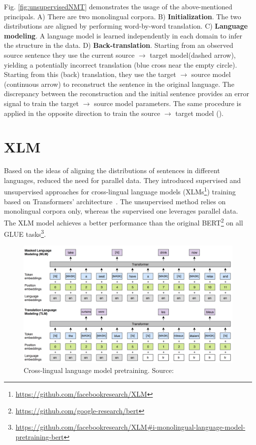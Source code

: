 Fig. \ref{fig:unsupervisedNMT} demonstrates the usage of the above-mentioned principals. A) There are two monolingual corpora. B) \textbf{Initialization}. The two distributions are aligned by performing word-by-word translation. C) \textbf{Language modeling}. A language model is learned independently in each domain to infer the structure in the data. D) \textbf{Back-translation}. Starting from an observed source sentence they use the current source $\rightarrow$ target model(dashed arrow), yielding a potentially incorrect translation (blue cross near the empty circle). Starting from this (back) translation, they use the target $\rightarrow$ source model (continuous arrow) to reconstruct the sentence in the original language. The discrepancy between the reconstruction and the initial sentence provides an error signal to train the target $\rightarrow$ source model parameters. The same procedure is applied in the opposite direction to train the source $\rightarrow$ target model (\cite{lample2018phrase}).

\section{XLM}
\label{sec:xlm}

Based on the ideas of aligning the distributions of sentences in different languages, \cite{lample2019cross} reduced the need for parallel data. They introduced supervised and unsupervised approaches for cross-lingual language models (XLMs\footnote{\href{https://github.com/facebookresearch/XLM}{https://github.com/facebookresearch/XLM}}) training based on Transformers' architecture~\cite{NIPS2017_7181}. The unsupervised method relies on monolingual corpora only, whereas the supervised one leverages parallel data. The XLM model achieves a better performance than the original BERT\footnote{\href{https://github.com/google-research/bert}{https://github.com/google-research/bert}} on all GLUE tasks\footnote{\href{https://github.com/facebookresearch/XLM\#i-monolingual-language-model-pretraining-bert}{https://github.com/facebookresearch/XLM\#i-monolingual-language-model-pretraining-bert}}.

\begin{figure}[h]
    \centering
    \includegraphics[width=14cm]{Images/xlm.png}
    \caption{Cross-lingual language model pretraining. Source: \cite{lample2019cross}}
    \label{fig:xlm}
\end{figure}

